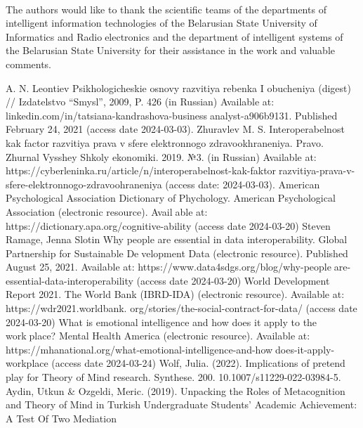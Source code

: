\documentclass[10pt, a4paper]{article}
\begin{document}
\begin{multicols}{2}
\paragraph{}
The authors would like to thank the scientific teams of
the departments of intelligent information technologies of
the Belarusian State University of Informatics and Radioelectronics and the department of intelligent systems of
the Belarusian State University for their assistance in the
work and valuable comments.
\begin{footnotesize}
\begin{thebibliography}{20}
     A. N. Leontiev Psikhologicheskie osnovy razvitiya rebenka I
obucheniya (digest) // Izdatelstvo “Smysl”, 2009, P. 426 (in
Russian)
     Available at: linkedin.com/in/tatsiana-kandrashova-businessanalyst-a906b9131. Published February 24, 2021 (access date
2024-03-03).
      Zhuravlev M. S. Interoperabelnost kak factor razvitiya prava
v sfere elektronnogo zdravookhraneniya. Pravo. Zhurnal
Vysshey Shkoly ekonomiki. 2019. №3. (in Russian) Available
at: https://cyberleninka.ru/article/n/interoperabelnost-kak-faktorrazvitiya-prava-v-sfere-elektronnogo-zdravoohraneniya (access
date: 2024-03-03).
     American Psychological Association Dictionary of Phychology.
American Psychological Association (electronic resource). Available at: https://dictionary.apa.org/cognitive-ability (access date
2024-03-20)
     Steven Ramage, Jenna Slotin Why people are essential in
data interoperability. Global Partnership for Sustainable Development Data (electronic resource). Published August 25,
2021. Available at: https://www.data4sdgs.org/blog/why-peopleare-essential-data-interoperability (access date 2024-03-20)
     World Development Report 2021. The World Bank (IBRD-IDA)
(electronic resource). Available at: https://wdr2021.worldbank.
org/stories/the-social-contract-for-data/ (access date 2024-03-20)
      What is emotional intelligence and how does it apply to the workplace? Mental Health America (electronic resource). Available
at: https://mhanational.org/what-emotional-intelligence-and-howdoes-it-apply-workplace (access date 2024-03-24)
      Wolf, Julia. (2022). Implications of pretend play for Theory of
Mind research. Synthese. 200. 10.1007/s11229-022-03984-5.
     Aydin, Utkun & Ozgeldi, Meric. (2019). Unpacking the Roles
of Metacognition and Theory of Mind in Turkish Undergraduate
Students’ Academic Achievement: A Test Of Two Mediation

\end{thebibliography}
\end{footnotesize}
\end{multicols}
\end{document}
